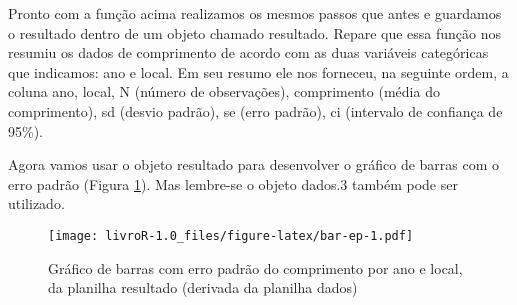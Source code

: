 \documentclass[]{book}
\newenvironment{Shaded}{\begin{snugshade}}{\end{snugshade}}
\newcommand{\DataTypeTok}[1]{\textcolor[rgb]{0.13,0.29,0.53}{#1}}
\newcommand{\DecValTok}[1]{\textcolor[rgb]{0.00,0.00,0.81}{#1}}
\newcommand{\FloatTok}[1]{\textcolor[rgb]{0.00,0.00,0.81}{#1}}
\newcommand{\KeywordTok}[1]{\textcolor[rgb]{0.13,0.29,0.53}{\textbf{#1}}}
\newcommand{\NormalTok}[1]{#1}
\newcommand{\OperatorTok}[1]{\textcolor[rgb]{0.81,0.36,0.00}{\textbf{#1}}}
\newcommand{\OtherTok}[1]{\textcolor[rgb]{0.56,0.35,0.01}{#1}}
\newcommand{\StringTok}[1]{\textcolor[rgb]{0.31,0.60,0.02}{#1}}
\begin{document}
Pronto com a função acima realizamos os mesmos passos que antes e guardamos o resultado dentro de um objeto chamado resultado. Repare que essa função nos resumiu os dados de comprimento de acordo com as duas variáveis categóricas que indicamos: ano e local. Em seu resumo ele nos forneceu, na seguinte ordem, a coluna ano, local, N (número de observações), comprimento (média do comprimento), sd (desvio padrão), se (erro padrão), ci (intervalo de confiança de 95\%).

Agora vamos usar o objeto resultado para desenvolver o gráfico de barras com o erro padrão (Figura \ref{fig:bar-ep}). Mas lembre-se o objeto dados.3 também pode ser utilizado.

\begin{Shaded}
\end{Shaded}

\begin{figure}
\centering
\texttt{[image: livroR-1.0\_files/figure-latex/bar-ep-1.pdf]}
\caption{\label{fig:bar-ep}Gráfico de barras com erro padrão do comprimento por ano e local, da planilha resultado (derivada da planilha dados)}
\end{figure}
\end{document}
